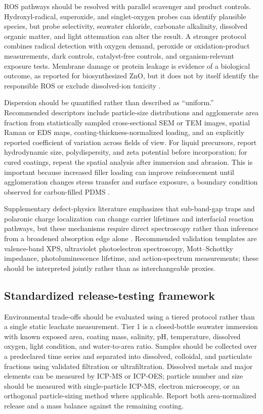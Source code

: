 ROS pathways should be resolved with parallel scavenger and product controls. Hydroxyl-radical, superoxide, and singlet-oxygen probes can identify plausible species, but probe selectivity, seawater chloride, carbonate alkalinity, dissolved organic matter, and light attenuation can alter the result. A stronger protocol combines radical detection with oxygen demand, peroxide or oxidation-product measurements, dark controls, catalyst-free controls, and organism-relevant exposure tests. Membrane damage or protein leakage is evidence of a biological outcome, as reported for biosynthesized ZnO, but it does not by itself identify the responsible ROS or exclude dissolved-ion toxicity \cite{dharmaraj_protein_2021}.

Dispersion should be quantified rather than described as ``uniform.'' Recommended descriptors include particle-size distributions and agglomerate area fraction from statistically sampled cross-sectional SEM or TEM images, spatial Raman or EDS maps, coating-thickness-normalized loading, and an explicitly reported coefficient of variation across fields of view. For liquid precursors, report hydrodynamic size, polydispersity, and zeta potential before incorporation; for cured coatings, repeat the spatial analysis after immersion and abrasion. This is important because increased filler loading can improve reinforcement until agglomeration changes stress transfer and surface exposure, a boundary condition observed for carbon-filled PDMS \cite{cavas_reinforcement_2018}.

Supplementary defect-physics literature emphasizes that sub-band-gap traps and polaronic charge localization can change carrier lifetimes and interfacial reaction pathways, but these mechanisms require direct spectroscopy rather than inference from a broadened absorption edge alone \cite{arxiv220102808,arxiv230506708}. Recommended validation templates are valence-band XPS, ultraviolet photoelectron spectroscopy, Mott--Schottky impedance, photoluminescence lifetime, and action-spectrum measurements; these should be interpreted jointly rather than as interchangeable proxies.

\subsection{Standardized release-testing framework}
Environmental trade-offs should be evaluated using a tiered protocol rather than a single static leachate measurement. Tier 1 is a closed-bottle seawater immersion with known exposed area, coating mass, salinity, pH, temperature, dissolved oxygen, light condition, and water-to-area ratio. Samples should be collected over a predeclared time series and separated into dissolved, colloidal, and particulate fractions using validated filtration or ultrafiltration. Dissolved metals and major elements can be measured by ICP-MS or ICP-OES; particle number and size should be measured with single-particle ICP-MS, electron microscopy, or an orthogonal particle-sizing method where applicable. Report both area-normalized release and a mass balance against the remaining coating.

